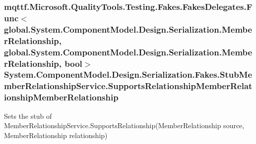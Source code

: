 \hypertarget{class_system_1_1_component_model_1_1_design_1_1_serialization_1_1_fakes_1_1_stub_member_relationship_service_a355dfa2fcc72bab6f7a6afa9ae6c689a}{
\subsubsection[{Supports\-Relationship\-Member\-Relationship\-Member\-Relationship}]{\setlength{\rightskip}{0pt plus 5cm}mqttf.\-Microsoft.\-Quality\-Tools.\-Testing.\-Fakes.\-Fakes\-Delegates.\-Func$<$global.\-System.\-Component\-Model.\-Design.\-Serialization.\-Member\-Relationship, global.\-System.\-Component\-Model.\-Design.\-Serialization.\-Member\-Relationship, bool$>$ System.\-Component\-Model.\-Design.\-Serialization.\-Fakes.\-Stub\-Member\-Relationship\-Service.\-Supports\-Relationship\-Member\-Relationship\-Member\-Relationship}}\label{class_system_1_1_component_model_1_1_design_1_1_serialization_1_1_fakes_1_1_stub_member_relationship_service_a355dfa2fcc72bab6f7a6afa9ae6c689a}


Sets the stub of Member\-Relationship\-Service.\-Supports\-Relationship(\-Member\-Relationship source, Member\-Relationship relationship)



